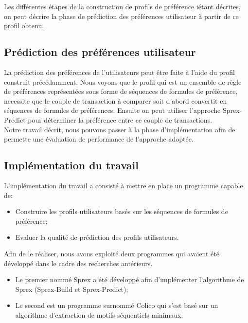 \documentclass[a4paper,12pt,openany,oneside]{article}
\begin{document}
Les différentes étapes de la construction de profils de préférence iétant décrites, on peut décrire la phase de prédiction des préférences utilisateur à partir de ce profil obtenu. 





\subsection{Prédiction des préférences utilisateur}
La prédiction des préférences de l'utilisateurs peut être faite à l'aide du profil construit précédamment. Nous voyons que le profil qui est un ensemble de règle de préférences représentées sous forme de séquences de formules de préférence, necessite que le couple de transaction à comparer soit d'abord convertit en séquences de formules de préférences. Ensuite on peut utiliser l'approche Sprex-Predict pour déterminer la préférence entre ce couple de transactions.\\

Notre travail décrit, nous pouvons passer à la phase d'implémentation afin de permette une évaluation de performance de l'approche adoptée.

\subsection{Implémentation du travail}
L'implémentation du travail a consisté à mettre en place un programme capable de:\\

\begin{itemize}
\item Construire les profils utilisateurs basés sur les séquences de formules de préférence;
\item Evaluer la qualité de prédiction des profils utilisateurs.\\
\end{itemize}

Afin de le réaliser, nous avons exploité deux programmes qui avaient été développé dans le cadre des recherches antérieurs.\\

\begin{itemize}
\item Le premier nommé Sprex a été développé afin d'implémenter l'algorithme de Sprex (Sprex-Build et Sprex-Predict);
\item Le second est un programme surnommé Colico qui s'est basé sur un algorithme d'extraction de motifs séquentiels minimaux.
\end{itemize}
\end{document}
